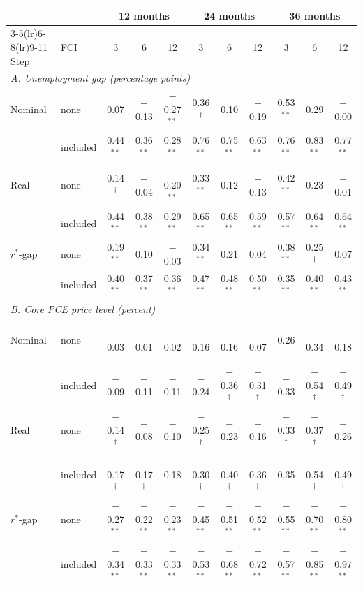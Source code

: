 \begin{tabular}{llccccccccc}
\toprule
 & & \multicolumn{3}{c}{12 months} & \multicolumn{3}{c}{24 months} & \multicolumn{3}{c}{36 months}\\
\cmidrule(lr){3-5}\cmidrule(lr){6-8}\cmidrule(lr){9-11}
Step & FCI & 3 & 6 & 12 & 3 & 6 & 12 & 3 & 6 & 12 \\
\midrule
\multicolumn{11}{l}{\textit{A. Unemployment gap (percentage points)}}\\
Nominal & none & 0.07 & $-$0.13 & $-$0.27$^{**}$ & 0.36$^{\dagger}$ & 0.10 & $-$0.19 & 0.53$^{**}$ & 0.29 & $-$0.00 \\
 & included & 0.44$^{**}$ & 0.36$^{**}$ & 0.28$^{**}$ & 0.76$^{**}$ & 0.75$^{**}$ & 0.63$^{**}$ & 0.76$^{**}$ & 0.83$^{**}$ & 0.77$^{**}$ \\
Real & none & 0.14$^{\dagger}$ & $-$0.04 & $-$0.20$^{**}$ & 0.33$^{**}$ & 0.12 & $-$0.13 & 0.42$^{**}$ & 0.23 & $-$0.01 \\
 & included & 0.44$^{**}$ & 0.38$^{**}$ & 0.29$^{**}$ & 0.65$^{**}$ & 0.65$^{**}$ & 0.59$^{**}$ & 0.57$^{**}$ & 0.64$^{**}$ & 0.64$^{**}$ \\
$r^*$-gap & none & 0.19$^{**}$ & 0.10 & $-$0.03 & 0.34$^{**}$ & 0.21 & 0.04 & 0.38$^{**}$ & 0.25$^{\dagger}$ & 0.07 \\
 & included & 0.40$^{**}$ & 0.37$^{**}$ & 0.36$^{**}$ & 0.47$^{**}$ & 0.48$^{**}$ & 0.50$^{**}$ & 0.35$^{**}$ & 0.40$^{**}$ & 0.43$^{**}$ \\
\midrule
\multicolumn{11}{l}{\textit{B. Core PCE price level (percent)}}\\
Nominal & none & $-$0.03 & $-$0.01 & $-$0.02 & $-$0.16 & $-$0.16 & $-$0.07 & $-$0.26$^{\dagger}$ & $-$0.34 & $-$0.18 \\
 & included & $-$0.09 & $-$0.11 & $-$0.11 & $-$0.24 & $-$0.36$^{\dagger}$ & $-$0.31$^{\dagger}$ & $-$0.33 & $-$0.54$^{\dagger}$ & $-$0.49$^{\dagger}$ \\
Real & none & $-$0.14$^{\dagger}$ & $-$0.08 & $-$0.10 & $-$0.25$^{\dagger}$ & $-$0.23 & $-$0.16 & $-$0.33$^{\dagger}$ & $-$0.37$^{\dagger}$ & $-$0.26 \\
 & included & $-$0.17$^{\dagger}$ & $-$0.17$^{\dagger}$ & $-$0.18$^{\dagger}$ & $-$0.30$^{\dagger}$ & $-$0.40$^{\dagger}$ & $-$0.36$^{\dagger}$ & $-$0.35$^{\dagger}$ & $-$0.54$^{\dagger}$ & $-$0.49$^{\dagger}$ \\
$r^*$-gap & none & $-$0.27$^{**}$ & $-$0.22$^{**}$ & $-$0.23$^{**}$ & $-$0.45$^{**}$ & $-$0.51$^{**}$ & $-$0.52$^{**}$ & $-$0.55$^{**}$ & $-$0.70$^{**}$ & $-$0.80$^{**}$ \\
 & included & $-$0.34$^{**}$ & $-$0.33$^{**}$ & $-$0.33$^{**}$ & $-$0.53$^{**}$ & $-$0.68$^{**}$ & $-$0.72$^{**}$ & $-$0.57$^{**}$ & $-$0.85$^{**}$ & $-$0.97$^{**}$ \\
\bottomrule
\end{tabular}
